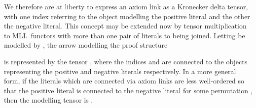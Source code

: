 \documentclass{LMCS}
\theoremstyle{plain}\newtheorem*{cLm}{Claim}
\newcommand{\mll}{MLL} \newcommand{\mall}{MALL}
\begin{document}
We therefore are at liberty to express an axiom link as a Kronecker delta tensor, with one index referring to the object modelling the positive literal and the other the negative literal. This concept may be extended now by tensor multiplication to \mll~functors with more than one pair of literals to being joined. Letting  be modelled by , the arrow modelling the proof structure
\begin{center} \vspace{5mm}
 \vspace{5mm}
\end{center}

\noindent is represented by the tensor , where the indices  and  are connected to the objects representing the  positive and negative literals respectively. In a more general form, if the literals which are connected via axiom links are less well-ordered so that the  positive literal is connected to the  negative literal for some permutation , then the modelling tensor is .
\newpage
\end{document}
